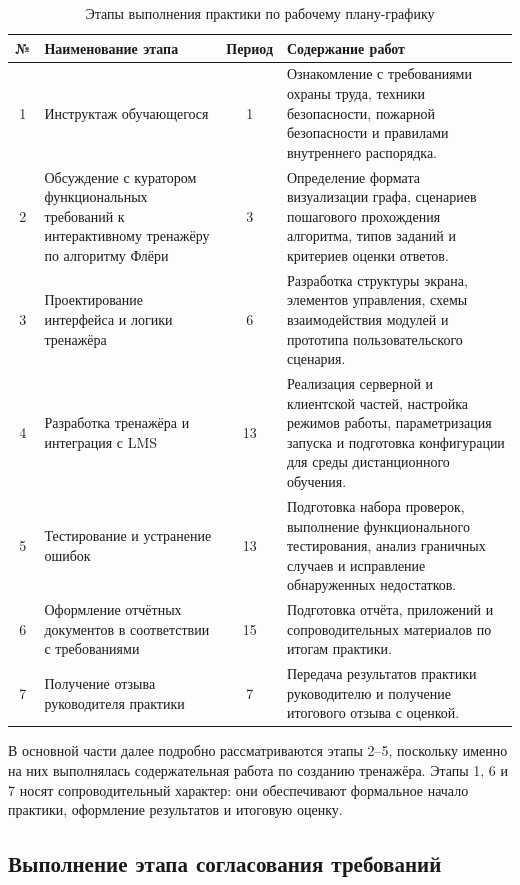 \documentclass[a4paper,12pt]{extarticle}
\begin{document}
\begin{table}[H]
\caption{Этапы выполнения практики по рабочему плану-графику}
\label{tab:stages}
\centering
\begin{tabular}{|c|p{4.7cm}|c|p{5.9cm}|}
\hline
\textbf{№} & \textbf{Наименование этапа} & \textbf{Период} & \textbf{Содержание работ} \\ \hline
1 & Инструктаж обучающегося & 1 & Ознакомление с требованиями охраны труда, техники безопасности, пожарной безопасности и правилами внутреннего распорядка. \\ \hline
2 & Обсуждение с куратором функциональных требований к интерактивному тренажёру по алгоритму Флёри & 3 & Определение формата визуализации графа, сценариев пошагового прохождения алгоритма, типов заданий и критериев оценки ответов. \\ \hline
3 & Проектирование интерфейса и логики тренажёра & 6 & Разработка структуры экрана, элементов управления, схемы взаимодействия модулей и прототипа пользовательского сценария. \\ \hline
4 & Разработка тренажёра и интеграция с LMS & 13 & Реализация серверной и клиентской частей, настройка режимов работы, параметризация запуска и подготовка конфигурации для среды дистанционного обучения. \\ \hline
5 & Тестирование и устранение ошибок & 13 & Подготовка набора проверок, выполнение функционального тестирования, анализ граничных случаев и исправление обнаруженных недостатков. \\ \hline
6 & Оформление отчётных документов в соответствии с требованиями & 15 & Подготовка отчёта, приложений и сопроводительных материалов по итогам практики. \\ \hline
7 & Получение отзыва руководителя практики & 7 & Передача результатов практики руководителю и получение итогового отзыва с оценкой. \\ \hline
\end{tabular}
\end{table}

В основной части далее подробно рассматриваются этапы 2--5, поскольку именно на них выполнялась содержательная работа по созданию тренажёра. Этапы 1, 6 и 7 носят сопроводительный характер: они обеспечивают формальное начало практики, оформление результатов и итоговую оценку.

\subsection{Выполнение этапа согласования требований}
\end{document}
